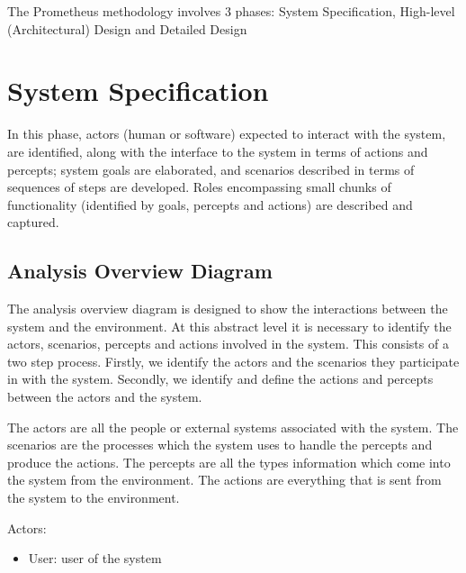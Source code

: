 \documentclass[a4paper]{article}
\begin{document}
The Prometheus methodology involves 3 phases: System Specification, High-level (Architectural) Design and Detailed Design

\section{System Specification}\label{sec:sysspec} 

In this phase, actors (human or software) expected to interact with the system, are identified, along with the interface to the system in terms of actions and percepts; system goals are elaborated, and scenarios described in terms of sequences of steps are developed. Roles encompassing small chunks of functionality (identified by goals, percepts and actions) are described and captured.

\subsection{Analysis Overview Diagram}

The analysis overview diagram is designed to show the interactions between the system and the environment. At this abstract level it is necessary to identify the actors, scenarios, percepts and actions involved in the system. This consists of a two step process. Firstly, we identify the actors and the scenarios they participate in with the system. Secondly, we identify and define the actions and percepts between the actors and the system.

The actors are all the people or external systems associated with the system. The scenarios are the processes which the system uses to handle the percepts and produce the actions. The percepts are all the types information which come into the system from the environment. The actions are everything that is sent from the system to the environment.


Actors:
\begin{itemize}
  \item User: user of the system
\end{itemize}
\end{document}

